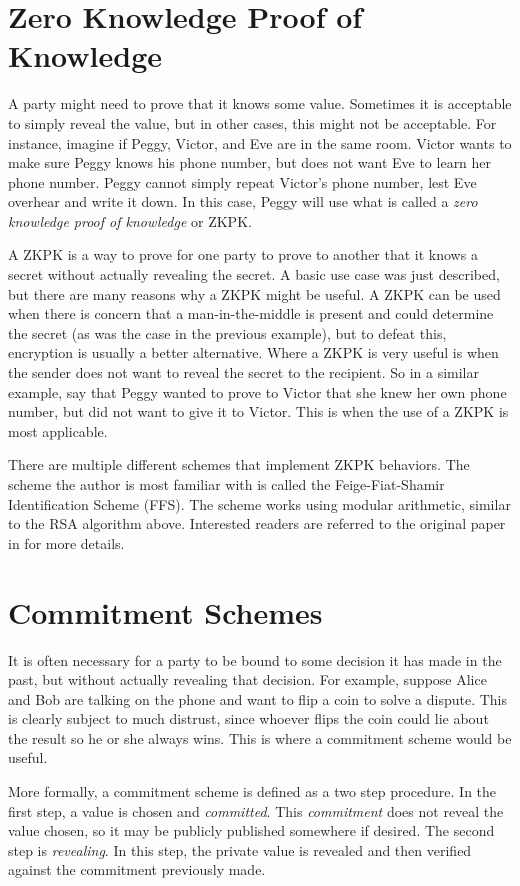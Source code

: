\section{Zero Knowledge Proof of Knowledge}
A party might need to prove that it knows some value. Sometimes it is acceptable
to simply reveal the value, but in other cases, this might not be acceptable. For instance, imagine
if Peggy, Victor, and Eve are in the same room. Victor wants to make sure Peggy knows his phone number,
but does not want Eve to learn her phone number. Peggy cannot simply repeat Victor's phone
number, lest Eve overhear and write it down. In this case, Peggy will use what is called a
\textit{zero knowledge proof of knowledge} or ZKPK.

A ZKPK is a way to prove for one party to prove to another that it knows a secret without actually
revealing the secret. A basic use case was just described, but there are many reasons why a ZKPK
might be useful. A ZKPK can be used when there is concern that a man-in-the-middle is present
and could determine the secret (as was the case in the previous example), but to defeat this,
encryption is usually a better alternative. Where a ZKPK is very useful is when the sender does not
want to reveal the secret to the recipient. So in a similar example, say that Peggy wanted to prove to
Victor that she knew her own phone number, but did not want to give it to Victor. This is when the
use of a ZKPK is most applicable.

There are multiple different schemes that implement ZKPK behaviors. 
The scheme the author is most familiar with is called the Feige-Fiat-Shamir Identification Scheme (FFS). 
The scheme works using modular arithmetic, similar to the RSA algorithm above.
Interested readers are referred to the original paper in \cite{ffs} for more details. 

\section{Commitment Schemes}
It is often necessary for a party to be bound to some decision it has made in the past, but without
actually revealing that decision. For example, suppose Alice and Bob are talking on the phone and
want to flip a coin to solve a dispute. This is clearly subject to much distrust, since whoever flips the
coin could lie about the result so he or she always wins.
This is where a commitment scheme would be useful.

More formally, a commitment scheme is defined as a two step procedure. In the first step, a value
is chosen and \textit{committed}. This \textit{commitment} does not reveal the value chosen, so it
may be publicly published somewhere if desired. The second step is \textit{revealing}. In this step,
the private value is revealed and then verified against the commitment previously made.

